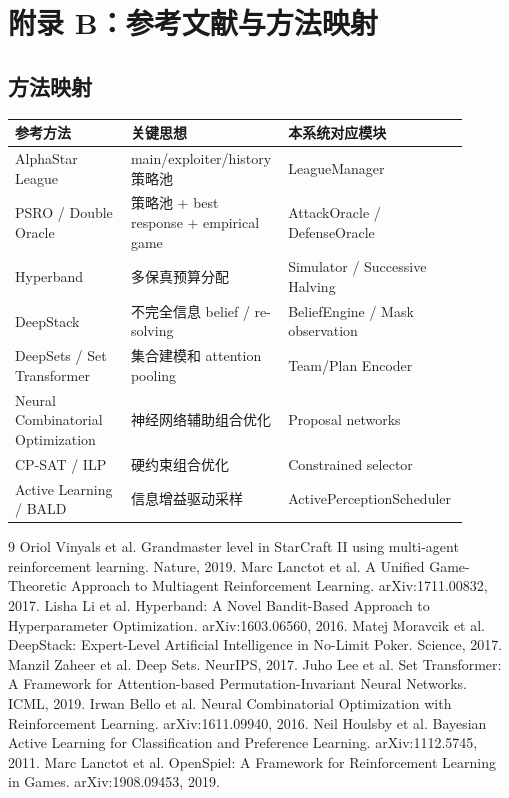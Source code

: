 \documentclass[UTF8,12pt,openany]{ctexbook}
\begin{document}
\chapter{附录 B：参考文献与方法映射}

\section{方法映射}
\begin{longtable}{p{0.25\linewidth}p{0.30\linewidth}p{0.35\linewidth}}
\toprule
参考方法 & 关键思想 & 本系统对应模块 \\
\midrule
AlphaStar League & main/exploiter/history 策略池 & LeagueManager \\
PSRO / Double Oracle & 策略池 + best response + empirical game & AttackOracle / DefenseOracle \\
Hyperband & 多保真预算分配 & Simulator / Successive Halving \\
DeepStack & 不完全信息 belief / re-solving & BeliefEngine / Mask observation \\
DeepSets / Set Transformer & 集合建模和 attention pooling & Team/Plan Encoder \\
Neural Combinatorial Optimization & 神经网络辅助组合优化 & Proposal networks \\
CP-SAT / ILP & 硬约束组合优化 & Constrained selector \\
Active Learning / BALD & 信息增益驱动采样 & ActivePerceptionScheduler \\
\bottomrule
\end{longtable}

\begin{thebibliography}{9}
 Oriol Vinyals et al. Grandmaster level in StarCraft II using multi-agent reinforcement learning. Nature, 2019.
 Marc Lanctot et al. A Unified Game-Theoretic Approach to Multiagent Reinforcement Learning. arXiv:1711.00832, 2017.
 Lisha Li et al. Hyperband: A Novel Bandit-Based Approach to Hyperparameter Optimization. arXiv:1603.06560, 2016.
 Matej Moravcik et al. DeepStack: Expert-Level Artificial Intelligence in No-Limit Poker. Science, 2017.
 Manzil Zaheer et al. Deep Sets. NeurIPS, 2017.
 Juho Lee et al. Set Transformer: A Framework for Attention-based Permutation-Invariant Neural Networks. ICML, 2019.
 Irwan Bello et al. Neural Combinatorial Optimization with Reinforcement Learning. arXiv:1611.09940, 2016.
 Neil Houlsby et al. Bayesian Active Learning for Classification and Preference Learning. arXiv:1112.5745, 2011.
 Marc Lanctot et al. OpenSpiel: A Framework for Reinforcement Learning in Games. arXiv:1908.09453, 2019.
\end{thebibliography}
\end{document}
